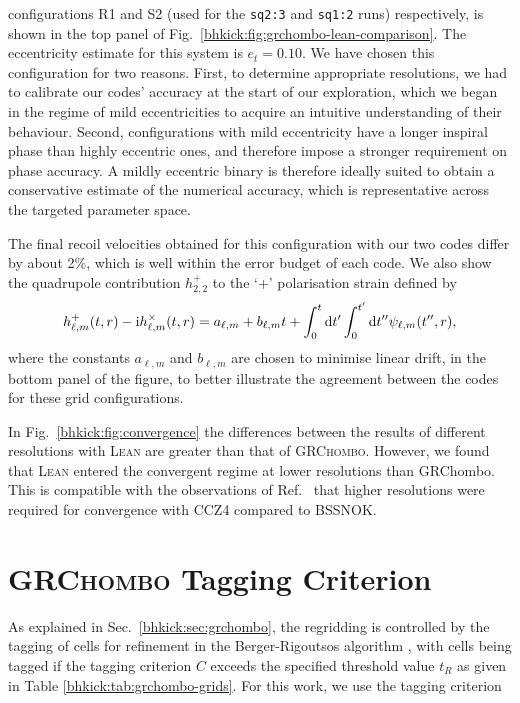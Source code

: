 configurations R1 and S2 (used for the \texttt{sq2:3} and \texttt{sq1:2} runs)
respectively, is shown in the top panel of Fig.~\ref{bhkick:fig:grchombo-lean-comparison}.
The eccentricity estimate for this system is $e_t=0.10$. We have chosen
this configuration for two reasons. First, to determine appropriate
resolutions, we had to calibrate our codes' accuracy at the start of
our exploration, which we began in the regime of mild eccentricities to
acquire an intuitive understanding of their behaviour. Second,
configurations with mild eccentricity have a longer inspiral phase
than highly eccentric ones, and therefore impose a stronger requirement
on phase accuracy. A mildly eccentric binary is therefore ideally suited
to obtain a conservative estimate of the numerical accuracy, which is representative across the targeted parameter space.

The final recoil velocities obtained for this configuration with
our two codes differ by about 2\%, which is well within the error budget
of each code.
We also show the quadrupole contribution
$h^+_{2,2}$ to the `+' polarisation strain defined by \cite{Bishop:2016lgv}
\begin{equation}
    h^+_{\ell,m}(t,r)-\mathrm{i}h^\times_{\ell,m}(t,r)
    = a_{\ell,m} + b_{\ell,m}t + \int_0^t\mathrm{d} t^\prime\int_0^{t^\prime}
    \mathrm{d} t^{\prime\prime}\psi_{\ell,m}(t^{\prime\prime},r),
    \label{bhkick:eq:strain}
\end{equation}
where the constants $a_{\ell,m}$ and $b_{\ell,m}$ are chosen to minimise
linear drift,
in the bottom panel of the figure, to better illustrate the agreement
between the codes for these grid configurations.

In Fig.~\ref{bhkick:fig:convergence} the differences between the results of
different resolutions with \textsc{Lean} are greater than that of
\textsc{GRChombo}. However, we found that \textsc{Lean} entered the
convergent regime at lower resolutions than {\sc GRChombo}. This is compatible
with the observations of Ref.~\cite{Alic:2011gg} that higher resolutions
were required for convergence with CCZ4 compared to BSSNOK.




\section{\textsc{GRChombo} Tagging Criterion}
\label{bhkick:sec:tagging}
%
%
As explained in Sec.~\ref{bhkick:sec:grchombo}, the regridding is controlled by
the tagging of cells for refinement in the Berger-Rigoutsos algorithm
\cite{Berger1991}, with cells being tagged if the tagging criterion $C$
exceeds the specified threshold value $t_R$ as given in Table
\ref{bhkick:tab:grchombo-grids}. For this work, we use the
tagging criterion

